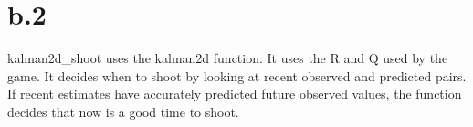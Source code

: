 \documentclass{article}
\begin{document}
\section{b.2}
kalman2d\_shoot uses the kalman2d function. It uses the R and Q used by the game. It decides when to shoot by looking at recent observed and predicted pairs. If recent estimates have accurately predicted future observed values, the function decides that now is a good time to shoot.
\end{document}
